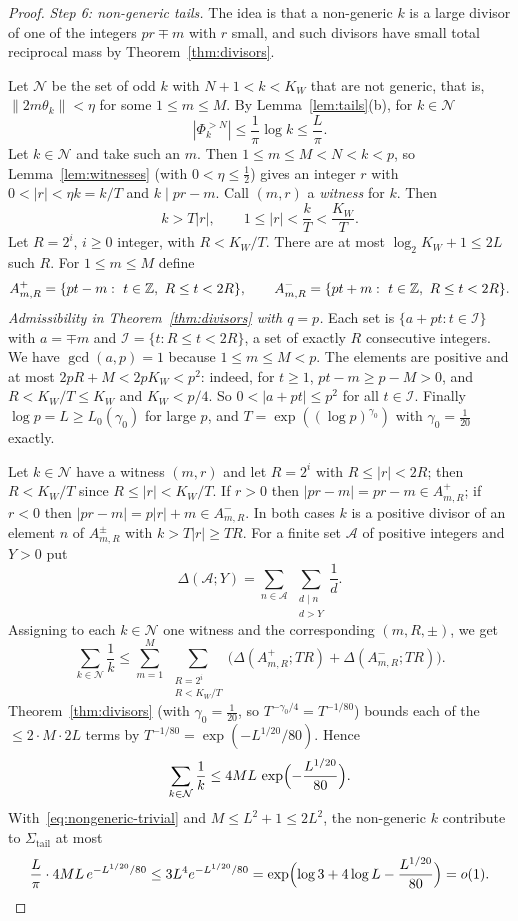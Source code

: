 \begin{proof}
\smallskip
\emph{Step 6: non-generic tails.} The idea is that a non-generic $k$ is a large divisor of one of the integers $pr\mp m$ with $r$ small, and such divisors have small total reciprocal mass by Theorem~\ref{thm:divisors}.

Let $\mathcal N$ be the set of odd $k$ with $N+1<k<K_W$ that are not generic, that is, $\|2m\theta_k\|<\eta$ for some $1\le m\le M$. By Lemma~\ref{lem:tails}(b), for $k\in\mathcal N$
\begin{equation}\label{eq:nongeneric-trivial}
|\Phi_k^{>N}|\le\frac1\pi\log k\le\frac L\pi .
\end{equation}
Let $k\in\mathcal N$ and take such an $m$. Then $1\le m\le M<N<k<p$, so Lemma~\ref{lem:witnesses} (with $0<\eta\le\frac12$) gives an integer $r$ with $0<|r|<\eta k=k/T$ and $k\mid pr-m$. Call $(m,r)$ a \emph{witness} for $k$. Then
\[
k>T|r|,\qquad 1\le|r|<\frac kT<\frac{K_W}T .
\]
Let $R=2^i$, $i\ge0$ integer, with $R<K_W/T$. There are at most $\log_2K_W+1\le2L$ such $R$. For $1\le m\le M$ define
\[
A^+_{m,R}=\{pt-m:\ t\in\mathbb{Z},\ R\le t<2R\},\qquad A^-_{m,R}=\{pt+m:\ t\in\mathbb{Z},\ R\le t<2R\}.
\]
\emph{Admissibility in Theorem~\ref{thm:divisors} with $q=p$.} Each set is $\{a+pt:t\in\mathcal I\}$ with $a=\mp m$ and $\mathcal I=\{t:R\le t<2R\}$, a set of exactly $R$ consecutive integers. We have $\gcd(a,p)=1$ because $1\le m\le M<p$. The elements are positive and at most $2pR+M<2pK_W<p^2$: indeed, for $t\ge1$, $pt-m\ge p-M>0$, and $R<K_W/T\le K_W$ and $K_W<p/4$. So $0<|a+pt|\le p^2$ for all $t\in\mathcal I$. Finally $\log p=L\ge L_0(\gamma_0)$ for large $p$, and $T=\exp((\log p)^{\gamma_0})$ with $\gamma_0=\frac1{20}$ exactly.

Let $k\in\mathcal N$ have a witness $(m,r)$ and let $R=2^i$ with $R\le|r|<2R$; then $R<K_W/T$ since $R\le|r|<K_W/T$. If $r>0$ then $|pr-m|=pr-m\in A^+_{m,R}$; if $r<0$ then $|pr-m|=p|r|+m\in A^-_{m,R}$. In both cases $k$ is a positive divisor of an element $n$ of $A^\pm_{m,R}$ with $k>T|r|\ge TR$. For a finite set $\mathcal A$ of positive integers and $Y>0$ put
\[
\Delta(\mathcal A;Y)=\sum_{n\in\mathcal A}\ \sum_{\substack{d\mid n\\ d>Y}}\frac1d .
\]
Assigning to each $k\in\mathcal N$ one witness and the corresponding $(m,R,\pm)$, we get
\[
\sum_{k\in\mathcal N}\frac1k\le\sum_{m=1}^M\ \sum_{\substack{R=2^i\\ R<K_W/T}}\bigl(\Delta(A^+_{m,R};TR)+\Delta(A^-_{m,R};TR)\bigr).
\]
Theorem~\ref{thm:divisors} (with $\gamma_0=\frac1{20}$, so $T^{-\gamma_0/4}=T^{-1/80}$) bounds each of the $\le2\cdot M\cdot2L$ terms by $T^{-1/80}=\exp(-L^{1/20}/80)$. Hence
\[
\sum_{k\in\mathcal N}\frac1k\le4ML\,\exp\Bigl(-\frac{L^{1/20}}{80}\Bigr).
\]
With~\eqref{eq:nongeneric-trivial} and $M\le L^2+1\le2L^2$, the non-generic $k$ contribute to $\Sigma_{\mathrm{tail}}$ at most
\begin{equation}\label{eq:nongeneric}
\frac L\pi\cdot4ML\,e^{-L^{1/20}/80}\le3L^4e^{-L^{1/20}/80}=\exp\Bigl(\log3+4\log L-\frac{L^{1/20}}{80}\Bigr)=o(1).
\end{equation}


\end{proof}
